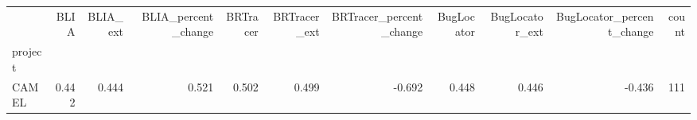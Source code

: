 \begin{tabular}{lrrrrrrrrrr}
\toprule
{} &  BLIA &  BLIA\_ext &  BLIA\_percent\_change &  BRTracer &  BRTracer\_ext &  BRTracer\_percent\_change &  BugLocator &  BugLocator\_ext &  BugLocator\_percent\_change &  count \\
project &       &           &                      &           &               &                          &             &                 &                            &        \\
\midrule
CAMEL   & 0.442 &     0.444 &                0.521 &     0.502 &         0.499 &                   -0.692 &       0.448 &           0.446 &                     -0.436 &    111 \\
\bottomrule
\end{tabular}
